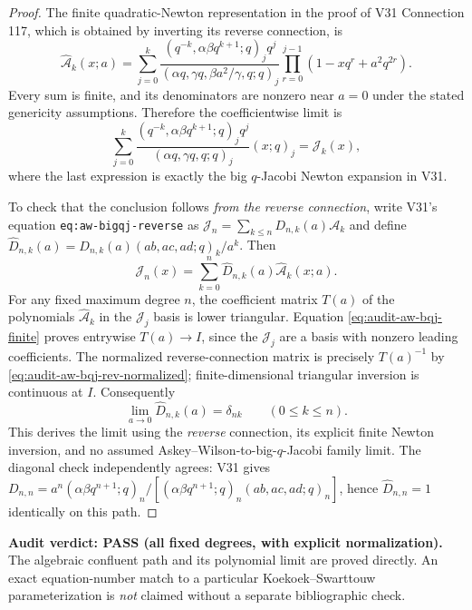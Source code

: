 \documentclass[11pt]{article}
\begin{document}
\begin{proof}
The finite quadratic-Newton representation in the proof of V31 Connection 117, which is obtained by inverting its reverse connection, is
\begin{equation}
\widehat{\mathcal A}_k(x;a)=
\sum_{j=0}^k\frac{(q^{-k},\alpha\beta q^{k+1};q)_j q^j}
 {(\alpha q,\gamma q,\beta a^2/\gamma,q;q)_j}
 \prod_{r=0}^{j-1}(1-xq^r+a^2q^{2r}).
\label{eq:audit-aw-bqj-finite}
\end{equation}
Every sum is finite, and its denominators are nonzero near $a=0$ under the stated genericity assumptions. Therefore the coefficientwise limit is
\[
\sum_{j=0}^k\frac{(q^{-k},\alpha\beta q^{k+1};q)_j q^j}
 {(\alpha q,\gamma q,q;q)_j}(x;q)_j=\mathcal J_k(x),
\]
where the last expression is exactly the big $q$-Jacobi Newton expansion in V31.

To check that the conclusion follows \emph{from the reverse connection}, write V31's equation \texttt{eq:aw-bigqj-reverse} as
$\mathcal J_n=\sum_{k\le n}D_{n,k}(a)\mathcal A_k$ and define
$\widehat D_{n,k}(a)=D_{n,k}(a)(ab,ac,ad;q)_k/a^k$.
Then
\begin{equation}
\mathcal J_n(x)=\sum_{k=0}^n\widehat D_{n,k}(a)\widehat{\mathcal A}_k(x;a).
\label{eq:audit-aw-bqj-rev-normalized}
\end{equation}
For any fixed maximum degree $n$, the coefficient matrix $T(a)$ of the polynomials $\widehat{\mathcal A}_k$ in the $\mathcal J_j$ basis is lower triangular. Equation \eqref{eq:audit-aw-bqj-finite} proves entrywise $T(a)\to I$, since the $\mathcal J_j$ are a basis with nonzero leading coefficients. The normalized reverse-connection matrix is precisely $T(a)^{-1}$ by \eqref{eq:audit-aw-bqj-rev-normalized}; finite-dimensional triangular inversion is continuous at $I$. Consequently
\[
\boxed{\lim_{a\to0}\widehat D_{n,k}(a)=\delta_{nk}\qquad(0\le k\le n).}
\]
This derives the limit using the \emph{reverse} connection, its explicit finite Newton inversion, and no assumed Askey--Wilson-to-big-$q$-Jacobi family limit. The diagonal check independently agrees: V31 gives
$D_{n,n}=a^n(\alpha\beta q^{n+1};q)_n/[(\alpha\beta q^{n+1};q)_n(ab,ac,ad;q)_n]$, hence $\widehat D_{n,n}=1$ identically on this path.
\end{proof}
\noindent\textbf{Audit verdict: PASS (all fixed degrees, with explicit normalization).} The algebraic confluent path and its polynomial limit are proved directly. An exact equation-number match to a particular Koekoek--Swarttouw parameterization is \emph{not} claimed without a separate bibliographic check.
\end{document}
